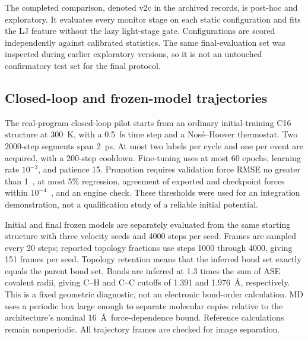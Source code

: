 The completed comparison, denoted v2c in the archived records, is
post-hoc and exploratory. It evaluates every monitor stage on each
static configuration and fits the LJ feature without the lazy
light-stage gate. Configurations are scored independently against
calibrated statistics. The same final-evaluation set was inspected
during earlier exploratory versions, so it is not an untouched
confirmatory test set for the final protocol.

\subsection{Closed-loop and frozen-model trajectories}
The real-program closed-loop pilot starts from an ordinary initial-training
C16 structure at 300~K, with a 0.5~fs time step and a
Nos\'e--Hoover thermostat. Two 2000-step segments span 2~ps.
At most two labels per cycle and one per event are acquired, with
a 200-step cooldown. Fine-tuning uses at most 60 epochs, learning
rate $10^{-3}$, and patience 15.
Promotion requires validation force RMSE no greater than
1~\forceunit, at most 5\% regression, agreement of exported and
checkpoint forces within $10^{-4}$~\forceunit, and an engine check.
These thresholds were used for an integration demonstration, not a
qualification study of a reliable initial potential.

Initial and final frozen models are separately evaluated from the
same starting structure with three velocity seeds and 4000 steps
per seed. Frames are sampled every 20 steps; reported topology
fractions use steps 1000 through 4000, giving 151 frames per seed.
Topology retention means that the inferred bond set exactly equals
the parent bond set. Bonds are inferred at 1.3 times the sum of
ASE covalent radii, giving C--H and C--C cutoffs of 1.391 and
1.976~\AA, respectively. This is a fixed geometric diagnostic,
not an electronic bond-order calculation.
MD uses a periodic box large enough to separate molecular copies
relative to the architecture's nominal 16~\AA\ force-dependence
bound. Reference calculations remain nonperiodic.
All trajectory frames are checked for image separation.
